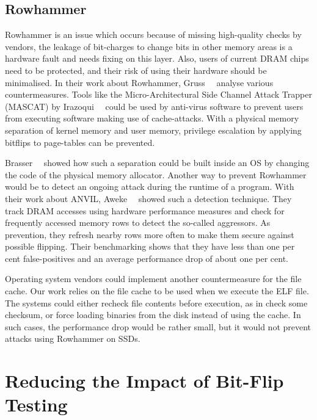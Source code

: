 \subsection{Rowhammer}

Rowhammer is an issue which occurs because of missing high-quality checks by
vendors, the leakage of bit-charges to change bits in other memory areas is a
hardware fault and needs fixing on this layer. Also, users of current DRAM
chips need to be protected, and their risk of using their hardware should be
minimalised. In their work about Rowhammer, Gruss~\etal~\cite{flipinthewall}
analyse various countermeasures. Tools like the Micro-Architectural Side
Channel Attack Trapper (MASCAT) by Irazoqui~\etal~\cite{mascat} could be used by
anti-virus software to prevent users from executing software making use of
cache-attacks. With a physical memory separation of kernel memory and user
memory, privilege escalation by applying bitflips to page-tables can be
prevented.

Brasser~\etal~\cite{canttouch} showed how such a separation could be built
inside an OS by changing the code of the physical memory allocator. Another
way to prevent Rowhammer would be to detect an ongoing attack during the runtime
of a program. With their work about ANVIL, Aweke~\etal~\cite{anvil} showed such
a detection technique. They track DRAM accesses using hardware performance
measures and check for frequently accessed memory rows to detect the so-called
aggressors. As prevention, they refresh nearby rows more often to make them
secure against possible flipping. Their benchmarking shows that they have less
than one per cent false-positives and an average performance drop of about one
per cent.

Operating system vendors could implement another countermeasure for the file
cache. Our work relies on the file cache to be used when we execute the ELF
file. The systems could either recheck file contents before execution, as
in check some checksum, or force loading binaries from the disk instead of
using the cache. In such cases, the performance drop would be rather small, but
it would not prevent attacks using Rowhammer on SSDs.

\section{Reducing the Impact of Bit-Flip Testing}

